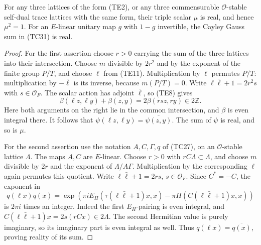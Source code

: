 \begin{lemma}\label{te-real-gauss}
For any three lattices of the form (TE2), or any three
commensurable $\mathcal O$-stable self-dual trace lattices
with the same form, their triple scalar $\mu$ is real,
and hence $\mu^2=1$.
For an $E$-linear unitary map $g$ with $1-g$ invertible,
the Cayley Gauss sum in (TC31) is real.
\end{lemma}
\begin{proof}
For the first assertion choose $r>0$ carrying the sum
of the three lattices into their intersection.
Choose $m$ divisible by $2r^2$ and by the exponent of
the finite group $P/T$, and choose $\ell$ from (TE11).
Multiplication by $\ell$ permutes $P/T$: multiplication
by $-\bar\ell$ is its inverse, because $m(P/T)=0$.
Write $\ell\bar\ell+1=2r^2s$ with
$s\in\mathcal O_F$.  The scalar action has adjoint
$\bar\ell$, so (TE8) gives
\[
 \beta(\ell z,\ell y)+\beta(z,y)
                       =2\beta(rsz,ry)\in2\mathbb Z.
\]
Here both arguments on the right lie in the common
intersection, and $\beta$ is even integral there.
It follows that
$\psi(\ell z,\ell y)=\overline{\psi(z,y)}$.
The sum of $\psi$ is real, and so is $\mu$.

For the second assertion use the notation $A,C,\Gamma,q$
of (TC27), on an $\mathcal O$-stable lattice $\Lambda$.
The maps $A,C$ are $E$-linear.
Choose $r>0$ with $rC\Lambda\subset\Lambda$, and choose
$m$ divisible by $2r$ and the exponent of
$\Lambda/A\Gamma$.
Multiplication by the corresponding $\ell$ again
permutes this quotient.  Write
$\ell\bar\ell+1=2rs$, $s\in\mathcal O_F$.
Since $C^*=-C$, the exponent in
\[
 q(\ell x)q(x)=
 \exp\!\left(\pi i E_H(\tau(\ell\bar\ell+1)x,x)
                   -\pi H(C(\ell\bar\ell+1)x,x)\right)
 \tag{TE12}
\]
is $2\pi i$ times an integer.
Indeed the first $E_H$-pairing is even integral, and
$C(\ell\bar\ell+1)x=2s(rCx)\in2\Lambda$.
The second Hermitian value is purely imaginary, so its
imaginary part is even integral as well.
Thus $q(\ell x)=\overline{q(x)}$, proving reality of
its sum.
\end{proof}

